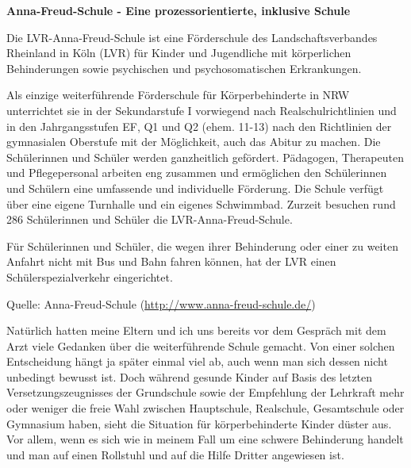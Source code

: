 \documentclass[fontsize=14pt,a4paper,headinclude,DIV=calc,automark]{scrbook}
\begin{document}
\begin{mdframed}[
    linewidth=0.3pt,         %
    linecolor=rahmenlinie,   %
    leftmargin=0, rightmargin=0,
    innertopmargin=12pt, innerbottommargin=12pt,
    innerleftmargin=12pt, innerrightmargin=12pt,
    backgroundcolor=white
]
\small\sffamily
\setlength{\parindent}{0pt} %

\textbf{Anna-Freud-Schule - Eine prozessorientierte, inklusive Schule}

\vspace{0.5\baselineskip}

Die LVR-Anna-Freud-Schule ist eine Förderschule des Landschaftsverbandes Rheinland in Köln (LVR) für Kinder und Jugendliche mit körperlichen Behinderungen sowie psychischen und psychosomatischen Erkrankungen.

\vspace{0.5\baselineskip}

Als einzige weiterführende Förderschule für Körperbehinderte in NRW unterrichtet sie in der Sekundarstufe I vorwiegend nach Realschulrichtlinien und in den Jahrgangsstufen EF, Q1 und Q2 (ehem. 11-13) nach den Richtlinien der gymnasialen Oberstufe mit der Möglichkeit, auch das Abitur zu machen. Die Schülerinnen und Schüler werden ganzheitlich gefördert. Pädagogen, Therapeuten und Pflegepersonal arbeiten eng zusammen und ermöglichen den Schülerinnen und Schülern eine umfassende und individuelle Förderung. Die Schule verfügt über eine eigene Turnhalle und ein eigenes Schwimmbad. Zurzeit besuchen rund 286 Schülerinnen und Schüler die LVR-Anna-Freud-Schule.

\vspace{0.5\baselineskip}

Für Schülerinnen und Schüler, die wegen ihrer Behinderung oder einer zu weiten Anfahrt nicht mit Bus und Bahn fahren können, hat der LVR einen Schülerspezialverkehr eingerichtet.

{\footnotesize Quelle: Anna-Freud-Schule (\url{http://www.anna-freud-schule.de/})}

\end{mdframed}

\vspace{0.8\baselineskip}

Natürlich hatten meine Eltern und ich uns bereits vor dem Gespräch mit dem Arzt viele Gedanken über die weiterführende Schule gemacht. Von einer solchen Entscheidung hängt ja später einmal viel ab, auch wenn man sich dessen nicht unbedingt bewusst ist. Doch während gesunde Kinder auf Basis des letzten Versetzungszeugnisses der Grundschule sowie der Empfehlung der Lehrkraft mehr oder weniger die freie Wahl zwischen Hauptschule, Realschule, Gesamtschule oder Gymnasium haben, sieht die Situation für körperbehinderte Kinder düster aus. Vor allem, wenn es sich wie in meinem Fall um eine schwere Behinderung handelt und man auf einen Rollstuhl und auf die Hilfe Dritter angewiesen ist.
\end{document}
